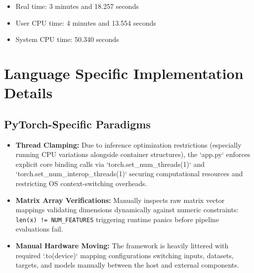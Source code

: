 \documentclass[12pt]{article}
\begin{document}
\begin{itemize}
    \item Real time: 3 minutes and 18.257 seconds
    \item User CPU time: 4 minutes and 13.554 seconds
    \item System CPU time: 50.340 seconds
\end{itemize}

\section{Language Specific Implementation Details}

\subsection{PyTorch-Specific Paradigms}
\begin{itemize}
    \item \textbf{Thread Clamping:} Due to inference optimization restrictions (especially running CPU variations alongside container structures), the `app.py` enforces explicit core binding calls via `torch.set\_num\_threads(1)` and `torch.set\_num\_interop\_threads(1)` securing computational resources and restricting OS context-switching overheads.
    \item \textbf{Matrix Array Verifications:} Manually inspects raw matrix vector mappings validating dimensions dynamically against numeric constraints: \texttt{len(x) != NUM\_FEATURES} triggering runtime panics before pipeline evaluations fail. 
    \item \textbf{Manual Hardware Moving:} The framework is heavily littered with required `.to(device)` mapping configurations switching inputs, datasets, targets, and models manually between the host and external components.
\end{itemize}
\end{document}
